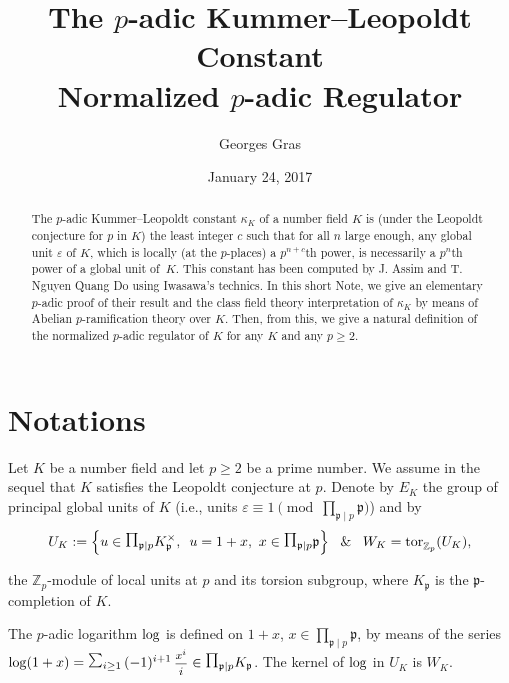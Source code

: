 \documentclass[12pt]{amsart}
\author[Georges Gras]{Georges Gras}
\theoremstyle{definition}
\numberwithin{equation}{section}
\begin{document}
 
\title[The $p$-adic Kummer--Leopoldt Constant] 
{The $p$-adic Kummer--Leopoldt Constant  \\  Normalized $p$-adic Regulator}

\date{January 24, 2017}

\begin{abstract} The $p$-adic Kummer--Leopoldt constant $\kappa_K$ 
of a number field $K$ is (under the Leopoldt conjecture for $p$ in $K$) the 
least integer $c$ such that for all $n$ large enough, any global unit 
$\varepsilon$ of $K$, which is locally (at the $p$-places) a $p^{n+c}$th power, is 
necessarily a $p^n$th power of a global unit of~$K$. This constant has been 
computed by J. Assim and T. Nguyen Quang Do using Iwasawa's technics. 
In this short Note, we give an elementary $p$-adic proof of their result and
the class field theory interpretation of $\kappa_K$ by means of 
Abelian $p$-ramification theory over $K$. 
Then, from this, we give a natural definition of the normalized $p$-adic 
regulator of $K$ for any $K$ and any $p\geq 2$.
\end{abstract}

\maketitle

\section{Notations}\label{section1} Let $K$ be a number field and let
$p\geq 2$ be a prime number.
We assume in the sequel that $K$ satisfies the Leopoldt conjecture at $p$. Denote by 
$E_K$ the group of principal global units of $K$ (i.e., units 
$\varepsilon \equiv 1 \! \pmod{ \prod_{{\mathfrak p} \mid p} {\mathfrak p}}$) and by 
$$U_K := \Big \{u \in {\displaystyle\mathop{\raise 2.0pt \hbox{$\prod$}}\limits}_{{\mathfrak p} \mid p}K_{\mathfrak p}^\times, \ \,
u = 1+x, \  x \in {\displaystyle\mathop{\raise 2.0pt \hbox{$\prod$}}\limits}_{{\mathfrak p} \mid p} {\mathfrak p} \Big\}\, \ \ \& \ \ \,
W_K = {\rm tor}_{{\mathbb{Z}}_p}^{}(U_K),$$ 

the ${\mathbb{Z}}_p$-module of local units at $p$ and its  torsion subgroup, where $K_{\mathfrak p}$ 
is the ${\mathfrak p}$-completion of $K$. 

\smallskip
The $p$-adic logarithm ${\rm log}$ is defined on $1+x$, 
$x \in \prod_{{\mathfrak p} \mid p} {\mathfrak p}$, 
by means of the series ${\rm log} (1+ x) = 
{\displaystyle\mathop{\raise 2.0pt \hbox{$\sum$}}\limits}_{i \ge 1}\, (-1)^{i+1} \, {\hbox{\footnotesize $\displaystyle \frac{{x^i}}{{i}}$}} \in {\displaystyle\mathop{\raise 2.0pt \hbox{$\prod$}}\limits}_{{\mathfrak p} \mid p}K_{\mathfrak p}$.
The kernel of ${\rm log}$ in $U_K$ is $W_K$.
\end{document}
